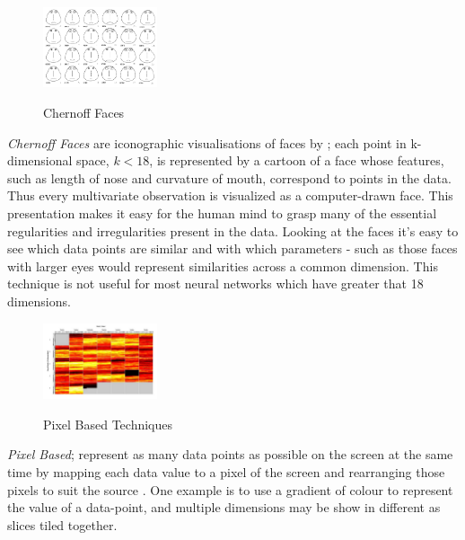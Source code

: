 \documentclass[a4paper,11pt,titlepage]{article}
\begin{document}
 	\begin{figure}[H]
    			\centering	
			{{\includegraphics[width=0.3\textwidth]
    				{img/chernoff_faces} 
    			}}%
    			\caption{Chernoff Faces}%
    		\label{fig:lascaux}
	\end{figure}
 		
		 \textit{Chernoff Faces} are iconographic visualisations of faces by \cite{Chernoff1973}; each point in k-dimensional space, $ k < 18 $, is represented by a cartoon of a face whose features, such as length of nose and curvature of mouth, correspond to points in the data. Thus every multivariate observation is visualized as a computer-drawn face. This presentation makes it easy for the human mind to grasp many of the essential regularities and irregularities present in the data. Looking at the faces it's easy to see which data points are similar and with which parameters - such as those faces with larger eyes would represent similarities across a common dimension. This technique is not useful for most neural networks which have greater that 18 dimensions.
		 \par
 		
 	\begin{figure}[H]
    			\centering	
			{{\includegraphics[width=0.3\textwidth]
    				{img/kiem_pixel_two} 
    			}}%
    			\caption{Pixel Based Techniques}%
    		\label{fig:lascaux}
	\end{figure}	
 		
		\textit{Pixel Based}; represent as many data points as possible on the screen at the same time by mapping each data value to a pixel of the screen and rearranging those pixels to suit the source \cite{Keim2000}. One example is to use a gradient of colour to represent the value of a data-point, and multiple dimensions may be show in different as slices tiled together.
		\par 
		 		
\end{document}
